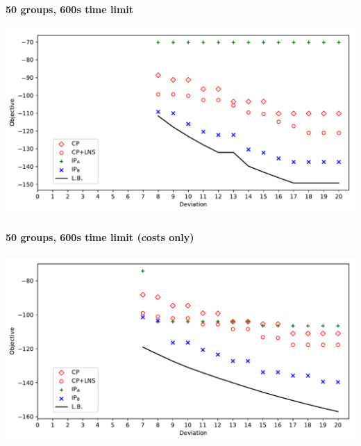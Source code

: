\documentclass{beamer}
\newcommand{\AutoSectionTitle}{}
\begin{document}
\begin{frame}
  \frametitle{\AutoSectionTitle}
  \framesubtitle{50 groups, 600s time limit}

  \begin{center}
    \includegraphics[scale=0.5]{results_50groups_tl600.pdf}
  \end{center}
  
\end{frame}




\begin{frame}
  \frametitle{\AutoSectionTitle}
  \framesubtitle{50 groups, 600s time limit (costs only)}

  \begin{center}
    \includegraphics[scale=0.5]{results_costsonly_50groups_tl600.pdf}
  \end{center}
  
\end{frame}


\end{document}
